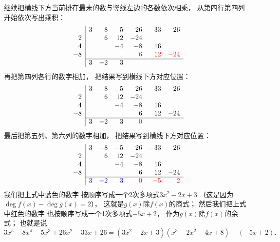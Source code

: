 继续把横线下方当前排在最末的数与竖线左边的各数依次相乘，
从第四行第四列开始依次写出乘积：\[
	\begin{array}{r|*6r}
		& 3 & -8 & -5 & 26 & -33 & 26 \\
		2 && 6 & 12 & -24 \\
		4 &&& -4 & -8 & 16 \\
		-8 &&&& \color{red}6 & \color{red}12 & \color{red}-24 \\ \cline{2-7}
		& 3 & -2 & 3
	\end{array}
\]
再把第四列各行的数字相加，
把结果写到横线下方对应位置：\[
	\begin{array}{r|*6r}
		& 3 & -8 & -5 & 26 & -33 & 26 \\
		2 && 6 & 12 & -24 \\
		4 &&& -4 & -8 & 16 \\
		-8 &&&& 6 & 12 & -24 \\ \cline{2-7}
		& 3 & -2 & 3 & \color{red}0
	\end{array}
\]
最后把第五列、第六列的数字相加，
把结果写到横线下方对应位置：\[
	\begin{array}{r|*6r}
		& 3 & -8 & -5 & 26 & -33 & 26 \\
		2 && 6 & 12 & -24 \\
		4 &&& -4 & -8 & 16 \\
		-8 &&&& 6 & 12 & -24 \\ \cline{2-7}
		& \color{blue}3 & \color{blue}-2 & \color{blue}3 & \color{red}0 & \color{red}-5 & \color{red}2
	\end{array}
\]
我们把上式中蓝色的数字
按顺序写成一个2次多项式\(3x^2-2x+3\)
（这是因为\(\deg f(x)-\deg g(x)=2\)），
这就是\(g(x)\)除\(f(x)\)的商式；
然后我们把上式中红色的数字
也按顺序写成一个1次多项式\(-5x+2\)，
作为\(g(x)\)除\(f(x)\)的余式；
也就是说\[
	3x^5 - 8x^4 - 5x^3 + 26x^2 - 33x + 26
	=(3x^2-2x+3)(x^3 - 2x^2 - 4x + 8)+(-5x+2).
\]
